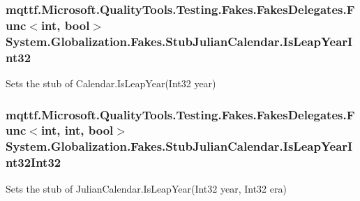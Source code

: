 \hypertarget{class_system_1_1_globalization_1_1_fakes_1_1_stub_julian_calendar_aa4a7c03d11867f3ac87b22980c0629db}{
\subsubsection[{Is\-Leap\-Year\-Int32}]{\setlength{\rightskip}{0pt plus 5cm}mqttf.\-Microsoft.\-Quality\-Tools.\-Testing.\-Fakes.\-Fakes\-Delegates.\-Func$<$int, bool$>$ System.\-Globalization.\-Fakes.\-Stub\-Julian\-Calendar.\-Is\-Leap\-Year\-Int32}}\label{class_system_1_1_globalization_1_1_fakes_1_1_stub_julian_calendar_aa4a7c03d11867f3ac87b22980c0629db}


Sets the stub of Calendar.\-Is\-Leap\-Year(\-Int32 year)

\hypertarget{class_system_1_1_globalization_1_1_fakes_1_1_stub_julian_calendar_af8ee7fb759f2f8878aaeac3692b96f6e}{
\subsubsection[{Is\-Leap\-Year\-Int32\-Int32}]{\setlength{\rightskip}{0pt plus 5cm}mqttf.\-Microsoft.\-Quality\-Tools.\-Testing.\-Fakes.\-Fakes\-Delegates.\-Func$<$int, int, bool$>$ System.\-Globalization.\-Fakes.\-Stub\-Julian\-Calendar.\-Is\-Leap\-Year\-Int32\-Int32}}\label{class_system_1_1_globalization_1_1_fakes_1_1_stub_julian_calendar_af8ee7fb759f2f8878aaeac3692b96f6e}


Sets the stub of Julian\-Calendar.\-Is\-Leap\-Year(\-Int32 year, Int32 era)

